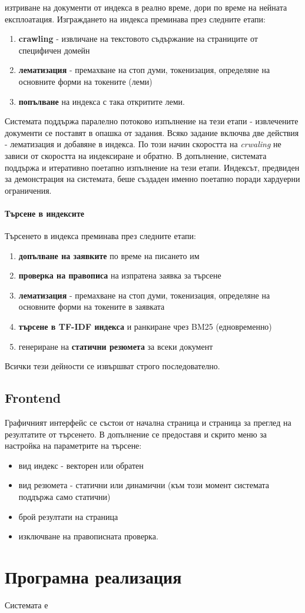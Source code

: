 \documentclass[a4paper,12pt]{article} \usepackage[utf8]{inputenc}
\begin{document}
изтриване на документи от индекса в реално време, дори по време на нейната
експлоатация. Изграждането на индекса преминава през следните етапи:
\begin{enumerate} \item \textbf{crawling} - извличане на текстовото съдържание
на страниците от специфичен домейн \item \textbf{лематизация} - премахване на
стоп думи, токенизация, определяне на основните форми на токените (леми) \item
\textbf{попълване} на индекса с така откритите леми. \end{enumerate} Системата
поддържа паралелно потоково изпълнение на тези етапи - извлечените документи се
поставят в опашка от задания. Всяко задание включва две действия - лематизация и
добавяне в индекса. По този начин скоростта на \emph{crwaling} не зависи от
скоростта на индексиране и обратно. В допълнение, системата поддържа и
итеративно поетапно изпълнение на тези етапи. Индексът, предвиден за
демонстрация на системата, беше създаден именно поетапно поради хардуерни
ограничения. \paragraph{Търсене в индексите} Търсенето в индекса преминава през
следните етапи: \begin{enumerate} \item \textbf{допълване на заявките} по време
на писането им \item \textbf{проверка на правописа} на изпратена заявка за
търсене \item \textbf{лематизация} - премахване на стоп думи, токенизация,
определяне на основните форми на токените в заявката \item \textbf{търсене в
TF-IDF индекса} и ранкиране чрез BM25 (едновременно) \item генериране на
\textbf{статични резюмета} за всеки документ \end{enumerate} Всички тези
дейности се извършват строго последователно. \subsection{Frontend} Графичният
интерфейс се състои от начална страница и страница за преглед на резултатите от
търсенето. В допълнение се предоставя и скрито меню за настройка на параметрите
на търсене: \begin{itemize} \item вид индекс - векторен или обратен \item вид
резюмета - статични или динамични (към този момент системата поддържа само
статични) \item брой резултати на страница \item изключване на правописната
проверка. \end{itemize} \newpage \section{Програмна реализация} Системата е
\end{document}
